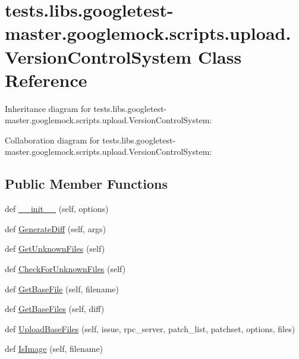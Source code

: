 \hypertarget{classtests_1_1libs_1_1googletest-master_1_1googlemock_1_1scripts_1_1upload_1_1VersionControlSystem}{}\section{tests.\+libs.\+googletest-\/master.googlemock.\+scripts.\+upload.\+Version\+Control\+System Class Reference}
\label{classtests_1_1libs_1_1googletest-master_1_1googlemock_1_1scripts_1_1upload_1_1VersionControlSystem}


Inheritance diagram for tests.\+libs.\+googletest-\/master.googlemock.\+scripts.\+upload.\+Version\+Control\+System\+:


Collaboration diagram for tests.\+libs.\+googletest-\/master.googlemock.\+scripts.\+upload.\+Version\+Control\+System\+:
\subsection*{Public Member Functions}
\begin{DoxyCompactItemize}
\item 
def \hyperlink{classtests_1_1libs_1_1googletest-master_1_1googlemock_1_1scripts_1_1upload_1_1VersionControlSystem_a0d8a25cd8263821c50d18cb29e5a1f38}{\+\_\+\+\_\+init\+\_\+\+\_\+} (self, options)
\item 
def \hyperlink{classtests_1_1libs_1_1googletest-master_1_1googlemock_1_1scripts_1_1upload_1_1VersionControlSystem_a5227261e5de1e0b3794ee32d435bc69c}{Generate\+Diff} (self, args)
\item 
def \hyperlink{classtests_1_1libs_1_1googletest-master_1_1googlemock_1_1scripts_1_1upload_1_1VersionControlSystem_adebdbf25354be524bbbac993ea03811a}{Get\+Unknown\+Files} (self)
\item 
def \hyperlink{classtests_1_1libs_1_1googletest-master_1_1googlemock_1_1scripts_1_1upload_1_1VersionControlSystem_ad68b7c0431d26411dde2d3070878587c}{Check\+For\+Unknown\+Files} (self)
\item 
def \hyperlink{classtests_1_1libs_1_1googletest-master_1_1googlemock_1_1scripts_1_1upload_1_1VersionControlSystem_a1b8b71612a810da0d5680937b727c5e3}{Get\+Base\+File} (self, filename)
\item 
def \hyperlink{classtests_1_1libs_1_1googletest-master_1_1googlemock_1_1scripts_1_1upload_1_1VersionControlSystem_ab7ad846f135c32606712284333bf4ff1}{Get\+Base\+Files} (self, diff)
\item 
def \hyperlink{classtests_1_1libs_1_1googletest-master_1_1googlemock_1_1scripts_1_1upload_1_1VersionControlSystem_a08021dd4376f8c9c04e75a7a115fbf1d}{Upload\+Base\+Files} (self, issue, rpc\+\_\+server, patch\+\_\+list, patchset, options, files)
\item 
def \hyperlink{classtests_1_1libs_1_1googletest-master_1_1googlemock_1_1scripts_1_1upload_1_1VersionControlSystem_aeeeeac1d2e4380fc5bdf618094eb06dd}{Is\+Image} (self, filename)
\end{DoxyCompactItemize}
